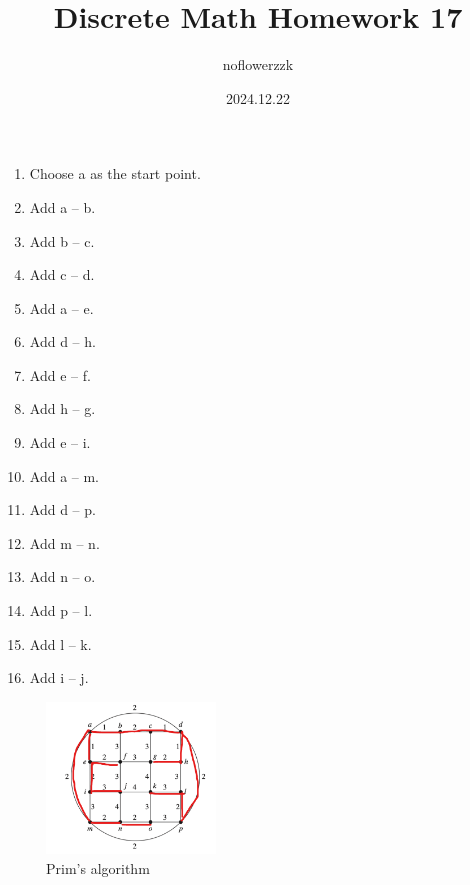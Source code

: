 \documentclass{article}
\title{Discrete Math Homework 17}
\author{noflowerzzk}
\date{2024.12.22}
\begin{document}
\maketitle

\section{}

\begin{enumerate}
    \item Choose a as the start point.
    \item Add a -- b.
    \item Add b -- c.
    \item Add c -- d.
    \item Add a -- e.
    \item Add d -- h.
    \item Add e -- f.
    \item Add h -- g.
    \item Add e -- i.
    \item Add a -- m.
    \item Add d -- p.
    \item Add m -- n.
    \item Add n -- o.
    \item Add p -- l.
    \item Add l -- k.
    \item Add i -- j.
\end{enumerate}

\begin{figure}[htbp]
    \centering
    \includegraphics[width=0.4\textwidth]{屏幕截图 2024-12-22 104712.png}
    \caption{Prim's algorithm}
\end{figure}

\section{}
\end{document}
